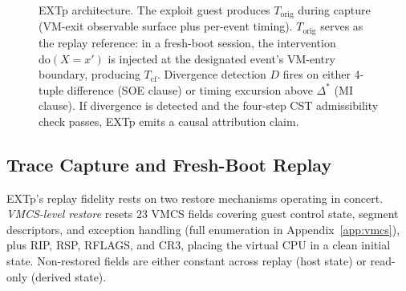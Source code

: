 \documentclass[conference]{IEEEtran}
\newcommand{\Korig}{T_\text{orig}}
\newcommand{\Tcf}{T_\text{cf}}
\newcommand{\Dstar}{\Delta^{*}}
\newcommand{\dox}[1]{\text{do}(X{=}#1)}
\begin{document}
\begin{figure}[t]
{%
  }
  \caption{EXTp architecture. The exploit guest produces $\Korig$
    during capture (VM-exit observable surface plus per-event
    timing). $\Korig$ serves as the replay reference: in a fresh-boot
    session, the intervention $\dox{x'}$ is injected at the
    designated event's VM-entry boundary, producing $\Tcf$. Divergence
    detection $D$ fires on either 4-tuple difference (SOE clause) or
    timing excursion above $\Dstar$ (MI clause). If divergence is
    detected and the four-step CST admissibility check passes, EXTp
    emits a causal attribution claim.}
  \label{fig:arch}
\end{figure}

\subsection{Trace Capture and Fresh-Boot Replay}

EXTp's replay fidelity rests on two restore mechanisms operating in
concert. \emph{VMCS-level restore} resets 23 VMCS fields covering
guest control state, segment descriptors, and exception handling
(full enumeration in Appendix~\ref{app:vmcs}), plus RIP, RSP, RFLAGS,
and CR3, placing the virtual CPU in a clean initial state.
Non-restored fields are either constant across replay (host state)
or read-only (derived state).
\end{document}
